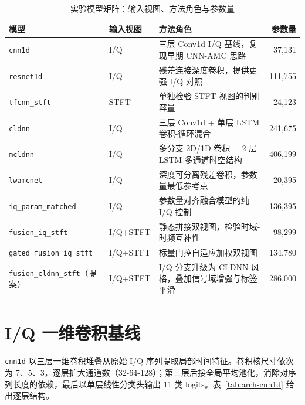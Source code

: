 \begin{table}[htbp]
  \centering
  \caption{实验模型矩阵：输入视图、方法角色与参数量}
  \label{tab:method-family-matrix}
  \small
  \begin{tabularx}{\textwidth}{llXr}
    \toprule
    模型 & 输入视图 & 方法角色 & 参数量 \\
    \midrule
    \texttt{cnn1d}\cite{oshea2016cnn}         & I/Q      & 三层 Conv1d I/Q 基线，复现早期 CNN-AMC 思路 & 37,131 \\
    \texttt{resnet1d}\cite{he2016resnet}       & I/Q      & 残差连接深度卷积，提供更强 I/Q 对照 & 111,755 \\
    \texttt{tfcnn\_stft}                       & STFT     & 单独检验 STFT 视图的判别容量 & 24,123 \\
    \texttt{cldnn}\cite{sainath2015cldnn,west2017deep} & I/Q & 三层 Conv1d + 单层 LSTM 卷积-循环混合 & 241,675 \\
    \texttt{mcldnn}\cite{xu2020mcldnn}         & I/Q      & 多分支 2D/1D 卷积 + 2 层 LSTM 多通道时空结构 & 406,199 \\
    \texttt{lwamcnet}\cite{wang2021lwamcnet}   & I/Q      & 深度可分离残差卷积，参数量最低参考点 & 20,395 \\
    \texttt{iq\_param\_matched}                & I/Q      & 参数量对齐融合模型的纯 I/Q 控制 & 136,395 \\
    \texttt{fusion\_iq\_stft}                  & I/Q+STFT & 静态拼接双视图，检验时域-时频互补性 & 98,299 \\
    \texttt{gated\_fusion\_iq\_stft}           & I/Q+STFT & 标量门控自适应加权双视图 & 134,780 \\
    \midrule
    \texttt{fusion\_cldnn\_stft}（提案）       & I/Q+STFT & I/Q 分支升级为 CLDNN 风格，叠加信号域增强与标签平滑 & 286,000 \\
    \bottomrule
  \end{tabularx}
\end{table}

\section{I/Q 一维卷积基线}

\texttt{cnn1d} 以三层一维卷积堆叠从原始 I/Q 序列提取局部时间特征\cite{oshea2016cnn}。卷积核尺寸依次为 7、5、3，逐层扩大通道数（32-64-128）；第三层后接全局平均池化，消除对序列长度的依赖，最后以单层线性分类头输出 11 类 logits。表~\ref{tab:arch-cnn1d} 给出逐层结构。

